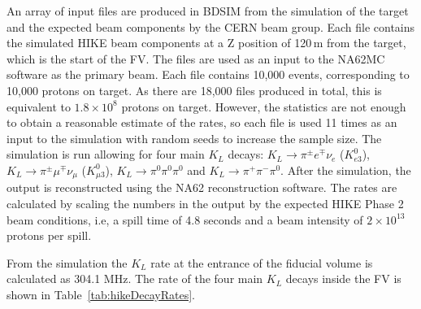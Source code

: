 \documentclass[../../main.tex]{subfiles}
\begin{document}
    An array of input files are produced in BDSIM \cite{Nevay2020BDSIM} from the simulation of the target and the expected beam components by the CERN beam group. Each file contains the simulated HIKE beam components at a Z position of 120\,m from the target, which is the start of the \gls{FV}. 
    The files are used as an input to the NA62MC software as the primary beam. Each file contains 10,000 events, corresponding to 10,000 protons on target. As there are 18,000 files produced in total, this is equivalent to $1.8 \times 10^8$ protons on target. 
    However, the statistics are not enough to obtain a reasonable estimate of the rates, so each file is used 11 times as an input to the simulation with random seeds to increase the sample size. The simulation is run allowing for four main $K_L$ decays: $ K_L \to \pi^{\pm} e^{\mp} \nu_e$ ($K_{e3}^{0}$), $ K_L \to \pi^{\pm} \mu^{\mp} \nu_{\mu}$ ($K_{\mu 3}^{0}$), $ K_L \to \pi^{0} \pi^{0} \pi^{0}$ and $ K_L \to \pi^{+} \pi^{-} \pi^{0}$.
    After the simulation, the output is reconstructed using the NA62 reconstruction software. The rates are calculated by scaling the numbers in the output by the expected HIKE Phase 2 beam conditions, i.e, a spill time of 4.8 seconds and a beam intensity of $2 \times 10^{13}$ protons per spill.

    
    From the simulation the $K_L$ rate at the entrance of the fiducial volume is calculated as 304.1 MHz. The rate of the four main $K_L$ decays inside the \gls{FV} is shown in Table~\ref{tab:hikeDecayRates}.
\end{document}
